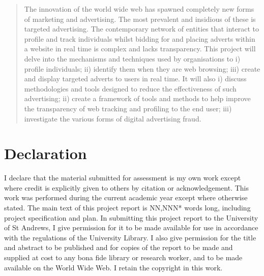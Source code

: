 \documentclass[12pt]{article}
\begin{document}
\pagestyle{plain}
\begin{abstract}
The innovation of the world wide web has spawned  completely new forms of marketing and advertising. The most prevalent and insidious of these  is targeted advertising. The contemporary network of entities that interact to profile and track individuals whilst  bidding for and placing adverts within a website in real time is complex and lacks transparency. This project will delve into the mechanisms and techniques used by organisations to i) profile individuals; ii) identify them when they are web browsing; iii) create and display targeted adverts to users in real time. It will also i) discuss methodologies and tools designed to reduce the effectiveness of such advertising;  ii) create a framework of tools and methods to help improve the transparency of web tracking and profiling to the end user; iii) investigate the various forms of digital advertising fraud.  
\end{abstract}

\section{Declaration}
I declare that the material submitted for assessment is my own work except where credit is explicitly
given to others by citation or acknowledgement. This work was performed during the current academic year
except where otherwise stated. The main text of this project report is NN,NNN* words long,
including project specification and plan. In submitting this project report to the University of St
Andrews, I give permission for it to be made available for use in accordance with the regulations of the
University Library. I also give permission for the title and abstract to be published and for copies of the report to be made and supplied at cost to any bona fide library or research worker, and to be made available on the World Wide Web. I retain the copyright in this work.

\pagebreak

\tableofcontents

\pagebreak

\pagestyle{fancy}
\end{document}
